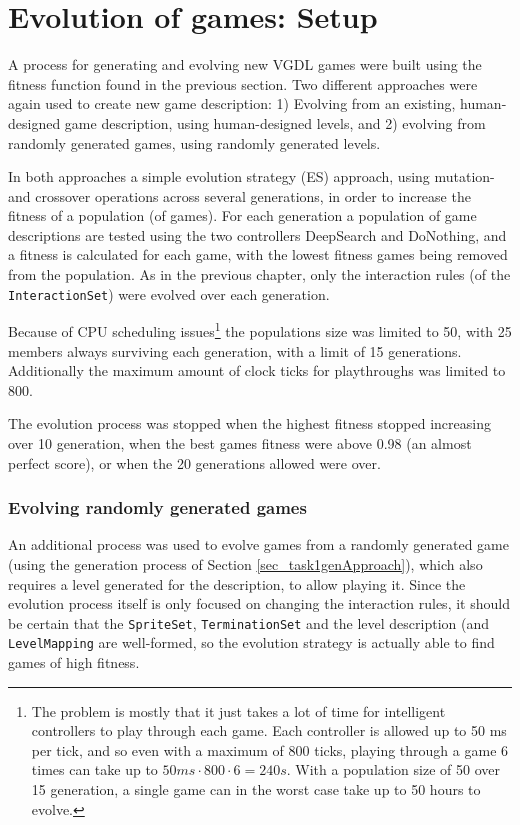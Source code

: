 \documentclass[a4paper,titlepage,final]{report}
\begin{document}

\section{Evolution of games: Setup}
\label{sec_task2evolvingGamesSetup}
A process for generating and evolving new VGDL games were built using the fitness function found in the previous section.
Two different approaches were again used to create new game description:
1) Evolving from an existing, human-designed game description, using human-designed levels, and 2) evolving from randomly generated games, using randomly generated levels.

In both approaches a simple evolution strategy (ES) approach, using mutation- and crossover operations across several generations, in order to increase the fitness of a population (of games).
For each generation a population of game descriptions are tested using the two controllers DeepSearch and DoNothing, and a fitness is calculated for each game, with the lowest fitness games being removed from the population.
As in the previous chapter, only the interaction rules (of the \texttt{InteractionSet}) were evolved over each generation.

Because of CPU scheduling issues\footnote{The problem is mostly that it just takes a lot of time for intelligent controllers to play through each game. Each controller is allowed up to 50 ms per tick, and so even with a maximum of 800 ticks, playing through a game 6 times can take up to $50ms \cdot 800 \cdot  6 = 240s$. With a population size of 50 over 15 generation, a single game can in the worst case take up to 50 hours to evolve.} the populations size was limited to 50, with 25 members always surviving each generation, with a limit of 15 generations.
Additionally the maximum amount of clock ticks for playthroughs was limited to 800.

The evolution process was stopped when the highest fitness stopped increasing over 10 generation, when the best games fitness were above 0.98 (an almost perfect score), or when the 20 generations allowed were over.



\subsubsection*{Evolving randomly generated games}
An additional process was used to evolve games from a randomly generated game (using the generation process of Section \ref{sec_task1genApproach}), which also requires a level generated for the description, to allow playing it.
Since the evolution process itself is only focused on changing the interaction rules, it should be certain that the \texttt{SpriteSet}, \texttt{TerminationSet} and the level description (and \texttt{LevelMapping} are well-formed, so the evolution strategy is actually able to find games of high fitness.
\end{document}
